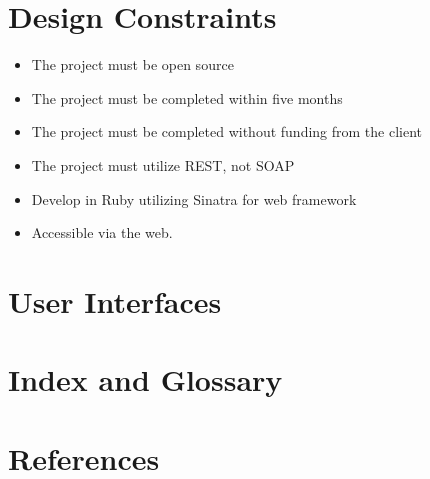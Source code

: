 \documentclass{article}
\begin{document}
\section{Design Constraints}
\begin{itemize}
\item The project must be open source
\item The project must be completed within five months
\item The project must be completed without funding from the client
\item The project must utilize REST, not SOAP
\item Develop in Ruby utilizing Sinatra for web framework
\item Accessible via the web.
\end{itemize} 

\section{User Interfaces}

\section{Index and Glossary}

\section{References}
\end{document}
